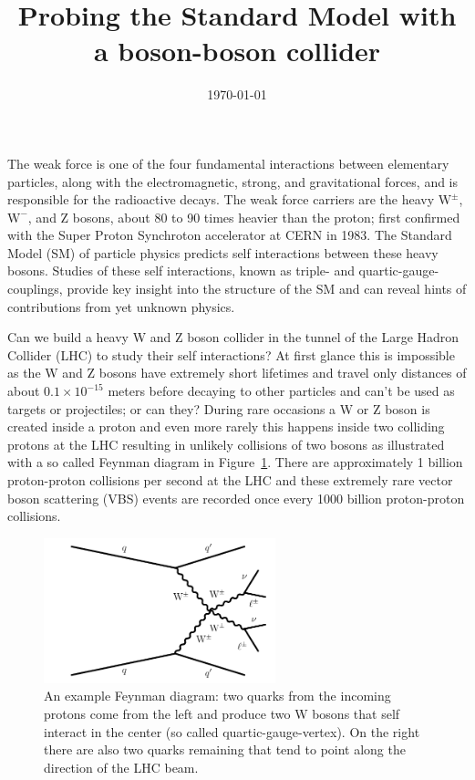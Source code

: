 \documentclass[12pt]{article}
\begin{document}
\title{Probing the Standard Model with a boson-boson collider}
\date{\today}
\maketitle

The weak force is one of the four fundamental interactions between elementary particles, along with the electromagnetic, strong, and gravitational forces, and is responsible for the radioactive decays. The weak force carriers are the heavy $\mathrm{W}^{\pm}$, $\mathrm{W}^{-}$, and Z bosons, about 80 to 90 times heavier than the proton; first confirmed with the Super Proton Synchroton accelerator at CERN in 1983. The Standard Model (SM) of particle physics predicts self interactions between these heavy bosons. Studies of these self interactions, known as triple- and quartic-gauge-couplings, provide key insight into the structure of the SM and can reveal hints of contributions from yet unknown physics. 

Can we build a heavy W and Z boson collider in the tunnel of the Large Hadron Collider (LHC) to study their self interactions? At first glance this is impossible as the W and Z bosons have extremely short lifetimes and travel only distances of about $0.1 \times 10^{-15}$ meters before decaying to other particles and can't be used as targets or projectiles; or can they? During rare occasions a W or Z boson is created inside a proton and even more rarely this happens inside two colliding protons at the LHC resulting in unlikely collisions of two bosons as illustrated with a so called Feynman diagram in Figure~\ref{fig:feynman}. There are approximately 1 billion proton-proton collisions per second at the LHC and these extremely rare vector boson scattering (VBS) events are recorded once every 1000 billion proton-proton collisions.

\begin{figure}[htb]
\centering
\includegraphics[width=0.60\textwidth]{figures/leptonic_vbs_quartic.pdf}
\caption{An example Feynman diagram: two quarks from the incoming protons come from the left and produce two W bosons that self interact in the center (so called quartic-gauge-vertex). On the right there are also two quarks remaining that tend to point along the direction of the LHC beam.}
\label{fig:feynman}
\end{figure}
\end{document}
